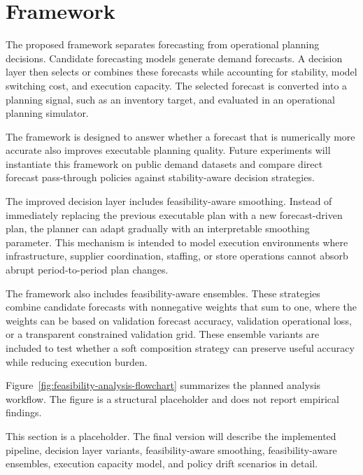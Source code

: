 \section{Framework}

The proposed framework separates forecasting from operational planning decisions. Candidate forecasting models generate demand forecasts. A decision layer then selects or combines these forecasts while accounting for stability, model switching cost, and execution capacity. The selected forecast is converted into a planning signal, such as an inventory target, and evaluated in an operational planning simulator.

The framework is designed to answer whether a forecast that is numerically more accurate also improves executable planning quality. Future experiments will instantiate this framework on public demand datasets and compare direct forecast pass-through policies against stability-aware decision strategies.

The improved decision layer includes feasibility-aware smoothing. Instead of immediately replacing the previous executable plan with a new forecast-driven plan, the planner can adapt gradually with an interpretable smoothing parameter. This mechanism is intended to model execution environments where infrastructure, supplier coordination, staffing, or store operations cannot absorb abrupt period-to-period plan changes.

The framework also includes feasibility-aware ensembles. These strategies combine candidate forecasts with nonnegative weights that sum to one, where the weights can be based on validation forecast accuracy, validation operational loss, or a transparent constrained validation grid. These ensemble variants are included to test whether a soft composition strategy can preserve useful accuracy while reducing execution burden.

Figure~\ref{fig:feasibility-analysis-flowchart} summarizes the planned analysis workflow. The figure is a structural placeholder and does not report empirical findings.



This section is a placeholder. The final version will describe the implemented pipeline, decision layer variants, feasibility-aware smoothing, feasibility-aware ensembles, execution capacity model, and policy drift scenarios in detail.
